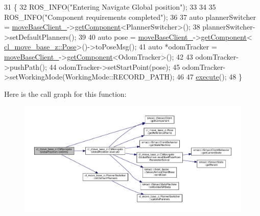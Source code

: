 \begin{DoxyCode}
31     \{
32         ROS\_INFO(\textcolor{stringliteral}{"Entering Navigate Global position"});
33 
34 
35         ROS\_INFO(\textcolor{stringliteral}{"Component requirements completed"});
36 
37         \textcolor{keyword}{auto} plannerSwitcher = \hyperlink{classcl__move__base__z_1_1CbMoveBaseClientBehaviorBase_ab2ef219464cfac8659b4a87c8d0db6d5}{moveBaseClient\_}->\hyperlink{classsmacc_1_1ISmaccClient_adef78db601749ca63c19e74a27cb88cc}{getComponent}<PlannerSwitcher>();
38         plannerSwitcher->setDefaultPlanners();
39 
40         \textcolor{keyword}{auto} pose = \hyperlink{classcl__move__base__z_1_1CbMoveBaseClientBehaviorBase_ab2ef219464cfac8659b4a87c8d0db6d5}{moveBaseClient\_}->\hyperlink{classsmacc_1_1ISmaccClient_adef78db601749ca63c19e74a27cb88cc}{getComponent}<
      \hyperlink{classcl__move__base__z_1_1Pose}{cl\_move\_base\_z::Pose}>()->toPoseMsg();
41         \textcolor{keyword}{auto} *odomTracker = \hyperlink{classcl__move__base__z_1_1CbMoveBaseClientBehaviorBase_ab2ef219464cfac8659b4a87c8d0db6d5}{moveBaseClient\_}->\hyperlink{classsmacc_1_1ISmaccClient_adef78db601749ca63c19e74a27cb88cc}{getComponent}<OdomTracker>();
42 
43         odomTracker->pushPath();
44         odomTracker->setStartPoint(pose);
45         odomTracker->setWorkingMode(WorkingMode::RECORD\_PATH);
46 
47         \hyperlink{classcl__move__base__z_1_1CbNavigateGlobalPosition_a0b8525ea9e4388b27cb1f9b1e06a3b63}{execute}();
48     \}
\end{DoxyCode}
Here is the call graph for this function\+:
\nopagebreak
\begin{figure}[H]
\begin{center}
\leavevmode
\includegraphics[width=350pt]{classcl__move__base__z_1_1CbNavigateGlobalPosition_a66d8b0555ef2945bc108dcd5171be292_cgraph}
\end{center}
\end{figure}
\mbox{\label{classcl__move__base__z_1_1CbNavigateGlobalPosition_a5c18268af1e7fc236aa155a58345d5d7}} 
